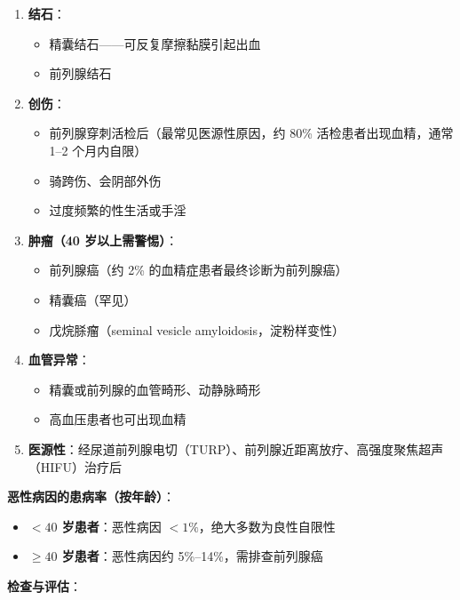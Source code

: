 \begin{enumerate}
\begin{enumerate}
	\item \textbf{结石}：
	\begin{itemize}
		\item 精囊结石——可反复摩擦黏膜引起出血
		\item 前列腺结石
	\end{itemize}

	\item \textbf{创伤}：
	\begin{itemize}
		\item 前列腺穿刺活检后（最常见医源性原因，约 80\% 活检患者出现血精，通常 1--2 个月内自限）
		\item 骑跨伤、会阴部外伤
		\item 过度频繁的性生活或手淫
	\end{itemize}

	\item \textbf{肿瘤（40 岁以上需警惕）}：
	\begin{itemize}
		\item 前列腺癌（约 2\% 的血精症患者最终诊断为前列腺癌）
		\item 精囊癌（罕见）
		\item 戊烷脎瘤（seminal vesicle amyloidosis，淀粉样变性）
	\end{itemize}

	\item \textbf{血管异常}：
	\begin{itemize}
		\item 精囊或前列腺的血管畸形、动静脉畸形
		\item 高血压患者也可出现血精
	\end{itemize}

	\item \textbf{医源性}：经尿道前列腺电切（TURP）、前列腺近距离放疗、高强度聚焦超声（HIFU）治疗后
\end{enumerate}

\vspace{0.5em}
\noindent\textbf{恶性病因的患病率（按年龄）}：
\begin{itemize}[leftmargin=2cm]
	\item \textbf{$<40$ 岁患者}：恶性病因 $<1\%$，绝大多数为良性自限性
	\item \textbf{$\geq 40$ 岁患者}：恶性病因约 5\%--14\%，需排查前列腺癌
\end{itemize}

\vspace{0.5em}
\noindent\textbf{检查与评估}：


\end{enumerate}
